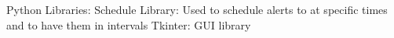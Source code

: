 Python Libraries:
Schedule Library: Used to schedule alerts to at specific times and to have them in intervals
Tkinter: GUI library